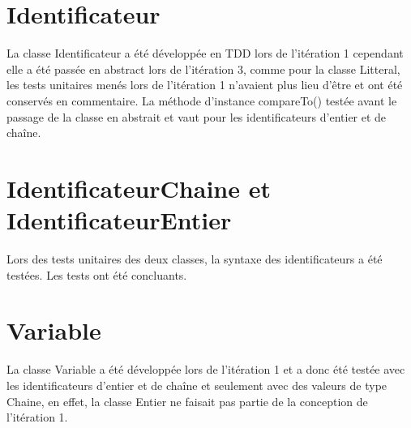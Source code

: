 
\section{Identificateur}

La classe Identificateur a été développée en TDD lors de l'itération 1
cependant elle a été passée en abstract lors de l'itération 3, comme
pour la classe Litteral, les tests unitaires menés lors de l'itération 1
n'avaient plus lieu d'être et ont été conservés en commentaire.
La méthode d'instance compareTo() testée avant le passage de la classe
en abstrait et vaut pour les identificateurs d'entier et de chaîne.

\section{IdentificateurChaine et IdentificateurEntier}

Lors des tests unitaires des deux classes, la syntaxe des identificateurs
a été testées. Les tests ont été concluants.

\section{Variable}

La classe Variable a été développée lors de l'itération 1 et a donc été
testée avec les identificateurs d'entier et de chaîne et seulement avec des
valeurs de type Chaine, en effet, la classe Entier ne faisait pas partie de
la conception de l'itération 1.